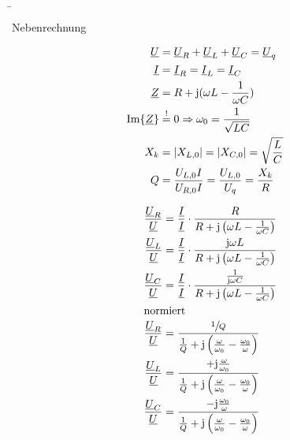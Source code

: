 \b{%
\begin{frame}{Nebenrechnung}
\begin{minipage}{0.3\textwidth}%
    \begin{align}
        \underline{U} &= \underline{U}_R + \underline{U}_L + \underline{U}_C = \underline{U}_q\\
        \underline{I} &= \underline{I}_R = \underline{I}_L = \underline{I}_C \\
        \underline{Z} &= R + \mathrm{j}(\omega L - \frac{1}{\omega C}) \\
        \mathllap{\Im\{\underline{Z}\}} &\overset{!}{=} 0 \Rightarrow \omega_0 =\frac{1}{\sqrt{LC}}\\
        X_k &= |X_{L,0}| = |X_{C,0}| =  \mathrlap{\sqrt{\frac{L}{C}}}\\
        Q &= \frac{U_{L,0}I}{U_{R,0} I} = \frac{U_{L,0}}{U_q} = \frac{X_k}{R}
    \end{align}
\end{minipage}\hfill%
\begin{minipage}{0.65\textwidth}\centering
    \begin{align*}
        \frac{\underline{U}_R}{\underline{U}} &= \frac{\underline{I}}{\underline{I}}
            \cdot \frac{R}{R+\mathrm{j}\left(\omega L-\frac{1}{\omega C}\right)}\\
        \frac{\underline{U}_L}{\underline{U}} &= \frac{\underline{I}}{\underline{I}}
            \cdot \frac{\mathrm{j}\omega L}{R+\mathrm{j}\left(\omega L-\frac{1}{\omega C}\right)}\\
        \frac{\underline{U}_C}{\underline{U}} &= \frac{\underline{I}}{\underline{I}}
            \cdot \frac{\frac{1}{\mathrm{j}\omega C}}{R+\mathrm{j}\left(\omega L-\frac{1}{\omega C}\right)}\\
        \intertext{normiert}
        \frac{\underline{U}_R}{\underline{U}} &= 
            \frac{\sfrac{1}{Q}}{\frac{1}{Q}+\mathrm{j}\left(\frac{\omega}{\omega_0}-\frac{\omega_0}{\omega}\right)}\\
        \frac{\underline{U}_L}{\underline{U}} &=
            \frac{+\mathrm{j}\frac{\omega}{\omega_0}}{\frac{1}{Q}+\mathrm{j}\left(\frac{\omega}{\omega_0}-\frac{\omega_0}{\omega}\right)}\\
        \frac{\underline{U}_C}{\underline{U}} &= 
            \frac{-\mathrm{j}\frac{\omega_0}{\omega}}{\frac{1}{Q}+\mathrm{j}\left(\frac{\omega}{\omega_0}-\frac{\omega_0}{\omega}\right)}
    \end{align*}
\end{minipage}
\end{frame}
}

